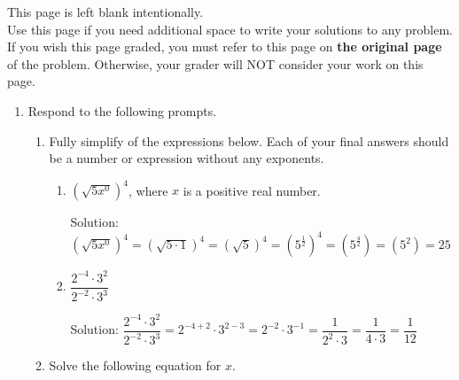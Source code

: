 \documentclass[11pt]{article}
\begin{document}
{    }

\vfill


\newpage

This page is left blank intentionally.\\

Use this page if you need additional space to write your solutions to any problem. \\

If you wish this page graded, you must refer to this page on \textbf{the original page} of the problem. Otherwise, your grader will NOT consider your work on this page.

\newpage%


\begin{enumerate}



\item Respond to the following prompts. 

\begin{enumerate}
    \item Fully simplify of the expressions below. Each of your final answers should be a number or expression without any exponents.

    \begin{enumerate}
        \item[(i)] $(\sqrt{5x^0})^{4}$, where $x$ is a positive real number. 
        \vspace{0.5cm}
        
{\color{blue}Solution: 
$(\sqrt{5x^0})^{4} = (\sqrt{5\cdot 1})^{4} = (\sqrt{5})^{4} = (5^{\frac{1}{2}})^{4} = (5^{\frac{4}{2}}) = (5^2) = 25$
}
        \vfill

        \item[(ii)] $\dfrac{2^{-4}\cdot3^2}{2^{-2}\cdot3^3}$

             \vspace{0.5cm}
        
{\color{blue}Solution: 
$\dfrac{2^{-4}\cdot3^2}{2^{-2}\cdot3^3} = 2^{-4 + 2}\cdot3^{2 - 3} = 2^{-2} \cdot 3^{-1} = \dfrac{1}{2^2 \cdot 3} = \dfrac{1}{4 \cdot 3} = \dfrac{1}{12}$
}
    \end{enumerate}

    \vfill

    \item Solve the following equation for $x$. 


\end{enumerate}
\end{enumerate}
\end{document}
